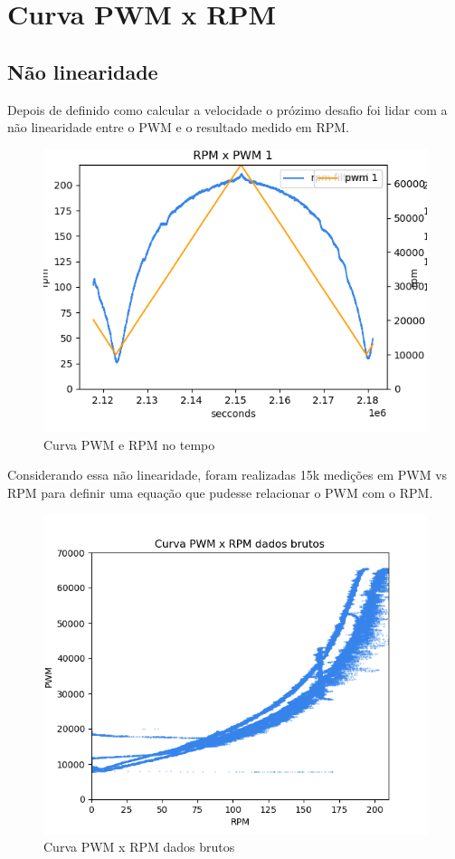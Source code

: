 
\chapter{Curva PWM x RPM}

\section{Não linearidade}

Depois de definido como calcular a velocidade o prózimo desafio foi lidar com a não linearidade entre o PWM e o resultado medido em RPM.

\begin{figure}[h]
	\centering
	\includegraphics{figures/pwm_x_rpm}
	\caption{Curva PWM e RPM no tempo}
	\label{fig:grafico_pwm_x_rpm}
\end{figure}

Considerando essa não linearidade, foram realizadas 15k medições em PWM vs RPM para definir uma equação que pudesse relacionar o PWM com o RPM.


\begin{figure}[h]
	\centering
	\includegraphics{figures/curva_pwm_x_rpm_dados_brutos}
	\caption{Curva PWM x RPM dados brutos}
	\label{fig:medicao_pwm_x_rpm_dados_brutos}
\end{figure}


